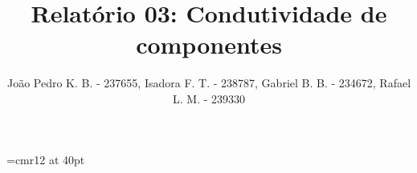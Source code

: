 \documentclass[reprint, amsmath,amssymb,onecolumn,notitlepage, 11pt, a4paper]{article}
\begin{document}
\font\myfont=cmr12 at 40pt


\title{Relatório 03: Condutividade de componentes} %
\author{João Pedro K. B. - 237655, Isadora F. T. - 238787, Gabriel B. B. - 234672, Rafael L. M. - 239330} %

\date{} %
\maketitle %


\clearpage


\clearpage


\end{document}
